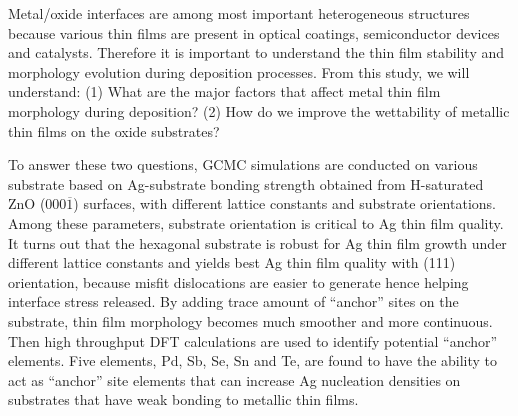 
Metal/oxide interfaces are among most important heterogeneous structures because various thin films are present in optical coatings, semiconductor devices and catalysts. Therefore it is important to understand the thin film stability and morphology evolution during deposition processes. From this study, we will understand: (1) What are the major factors that affect metal thin film morphology during deposition? (2) How do we improve the wettability of metallic thin films on the oxide substrates?

To answer these two questions, \ac{GCMC} simulations are conducted on various substrate based on Ag-substrate bonding strength obtained from H-saturated ZnO (000$\overline{1}$) surfaces, with different lattice constants and substrate orientations. Among these parameters, substrate orientation is critical to Ag thin film quality. It turns out that the hexagonal substrate is robust for Ag thin film growth under different lattice constants and yields best Ag thin film quality with (111) orientation, because misfit dislocations are easier to generate hence helping interface stress released. 
By adding trace amount of ``anchor'' sites on the substrate, thin film morphology becomes much smoother and more continuous. Then high throughput \ac{DFT} calculations are used to identify potential ``anchor'' elements. Five elements, Pd, Sb, Se, Sn and Te, are found to have the ability to act as ``anchor'' site elements that can increase Ag nucleation densities on substrates that have weak bonding to metallic thin films.




